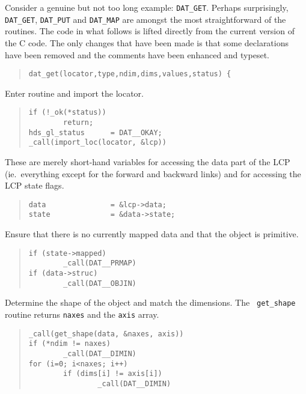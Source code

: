 Consider a genuine but not too long example: {\tt DAT\_GET}. Perhaps
surprisingly, {\tt DAT\_GET}, {\tt DAT\_PUT} and {\tt DAT\_MAP} are amongst
the most straightforward of the routines. The code in what follows is lifted
directly from the current version of the C code. The only changes that have
been made is that some declarations have been removed and the comments
have been enhanced and typeset.

\begin {quote}
\begin {verbatim}
dat_get(locator,type,ndim,dims,values,status) {
\end{verbatim}
\end {quote}

Enter routine and import the locator.        

\begin {quote}
\begin {verbatim}
if (!_ok(*status))
        return;
hds_gl_status      = DAT__OKAY;
_call(import_loc(locator, &lcp))
\end{verbatim}
\end {quote}

These are merely short-hand variables for accessing the data part of the LCP
(ie.\ everything except for the forward and backward links) and for accessing
the LCP state flags.

\begin {quote}
\begin {verbatim}
data               = &lcp->data;
state              = &data->state;
\end{verbatim}
\end {quote}

Ensure that there is no currently mapped data and that the object is primitive. 

\begin {quote}
\begin {verbatim}
if (state->mapped)
        _call(DAT__PRMAP)
if (data->struc)
        _call(DAT__OBJIN)
\end{verbatim}
\end {quote}

Determine the shape of the object and match the dimensions. The {\tt
get\_shape} routine returns {\tt naxes} and the {\tt axis} array. 

\begin {quote}
\begin {verbatim}
_call(get_shape(data, &naxes, axis))
if (*ndim != naxes)
        _call(DAT__DIMIN)
for (i=0; i<naxes; i++)
        if (dims[i] != axis[i])
                _call(DAT__DIMIN)
\end{verbatim}
\end {quote}


